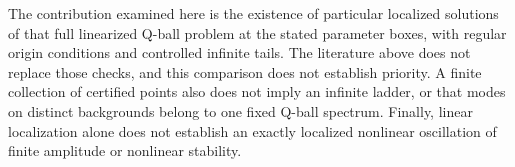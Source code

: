 The contribution examined here is the existence of particular localized
solutions of that full linearized Q-ball problem at the stated parameter
boxes, with regular origin conditions and controlled infinite tails.
The literature above does not replace those checks, and this comparison
does not establish priority. A finite collection of certified points also
does not imply an infinite ladder, or that modes on distinct backgrounds
belong to one fixed Q-ball spectrum. Finally, linear localization alone
does not establish an exactly localized nonlinear oscillation of finite
amplitude or nonlinear stability.
